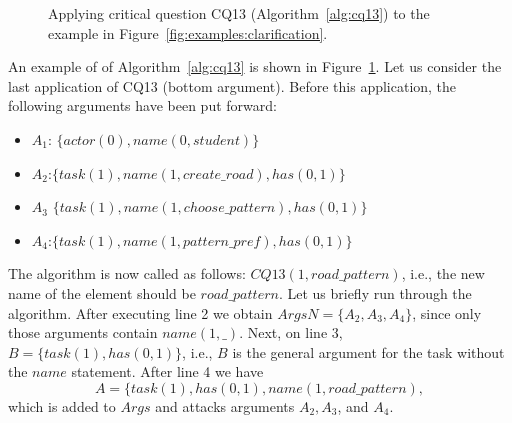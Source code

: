 \begin{figure}[ht!]
\centering
\caption{Applying critical question CQ13 (Algorithm~\ref{alg:cq13}) to the example in Figure~\ref{fig:examples:clarification}.}
\label{fig:examples:clarification:formal}
\end{figure} 

An example of of Algorithm~\ref{alg:cq13} is shown in Figure~\ref{fig:examples:clarification:formal}. Let us consider the last application of CQ13 (bottom argument). Before this application, the following arguments have been put forward:
\begin{itemize}
\item $A_1$: $\{actor(0),name(0,student)\}$
\item $A_2$:$\{task(1),name(1,create\_road),has(0,1)\}$
\item $A_3$ $\{task(1),name(1,choose\_pattern),has(0,1)\}$
\item $A_4$:$\{task(1),name(1,pattern\_pref),has(0,1)\}$
\end{itemize}
The algorithm is now called as follows: $CQ13(1,road\_pattern)$, i.e., the new name of the element should be $road\_pattern$. Let us briefly run through the algorithm. After executing line 2 we obtain $ArgsN=\{A_2,A_3,A_4\}$, since only those arguments contain $name(1,\_)$. Next, on line 3, $B=\{task(1),has(0,1)\}$, i.e., $B$ is the general argument for the task without the $name$ statement. After line 4 we have $$A=\{task(1),has(0,1),name(1,road\_pattern),$$ which is added to $Args$ and attacks arguments $A_2,A_3$, and $A_4$. 

